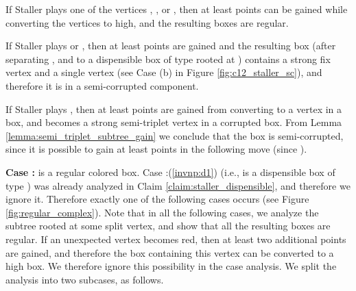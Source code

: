 \documentclass[11pt]{article}
\theoremstyle{definition}
\begin{document}
If Staller plays one of the vertices , ,  or , then at least  points can be gained while converting the  vertices to high, and the resulting boxes are regular.

If Staller plays  or , then at least  points are gained and the resulting box (after separating ,  and  to a dispensible box of type  rooted at )
contains a strong fix vertex and a single  vertex (see Case (b) in Figure \ref{fig:c12_staller_sc}), and therefore it is in a semi-corrupted component. 

If Staller plays , then at least  points are gained from converting  to a  vertex in a  box, and  becomes a strong semi-triplet vertex in a corrupted box.
From Lemma \ref{lemma:semi_triplet_subtree_gain} we conclude that the box is semi-corrupted, since it is possible to gain at least  points in the following move (since ).

\bigskip
\par\noindent
{\bf Case :}
 is a regular colored box.
Case :(\ref{invnp:d1}) (i.e.,  is a dispensible box of type ) was already analyzed in Claim \ref{claim:staller_dispensible}, and therefore we ignore it.
Therefore exactly one of the following cases occurs (see Figure \ref{fig:regular_complex}).
Note that in all the following cases, we analyze the subtree rooted at some split vertex, and show that all the resulting boxes are regular. 
If an unexpected vertex becomes red, then at least two additional points are gained, and therefore the box containing this vertex can be converted to a high box. 
We therefore ignore this possibility in the case analysis.
We split the analysis into two subcases, as follows.
\end{document}
